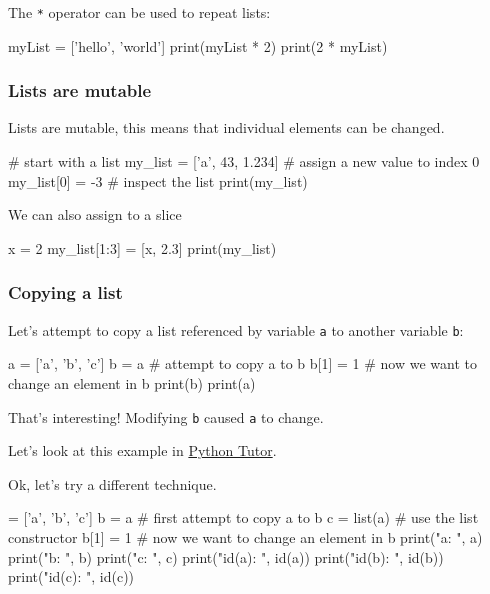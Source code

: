 \documentclass[12pt]{article} \newif\ifsolution\solutiontrue %
\begin{document}
The \texttt{*} operator can be used to repeat lists:

\begin{python}
myList = ['hello', 'world'] print(myList * 2) print(2 * myList)
\end{python}

\subsubsection{Lists are mutable}\label{lists-are-mutable}

Lists are mutable, this means that individual elements can be changed.

\begin{python}
# start with a list my_list = ['a', 43, 1.234] # assign a new value to index 0 my_list[0] = -3 # inspect the list print(my_list)
\end{python}

We can also assign to a slice

\begin{python}
x = 2 my_list[1:3] = [x, 2.3] print(my_list)
\end{python}


\subsubsection{Copying a list}\label{copying-a-list}

Let's attempt to copy a list referenced by variable \texttt{a} to
another variable \texttt{b}:

\begin{python}
a = ['a', 'b', 'c'] b = a # attempt to copy a to b b[1] = 1 # now we want to change an element in b print(b) print(a)
\end{python}

That's interesting! Modifying \texttt{b} caused \texttt{a} to change.

Let's look at this example in
\href{http://pythontutor.com/iframe-embed.html\#code=a+\%3D+\%5B'a',+'b',+'c'\%5D\%0Ab+\%3D+a+\%23+attempt+to+copy+a+to+b\%0Ab\%5B1\%5D+\%3D+1+\%23+now+we+want+to+change+an+element+in+b\%0Aprint(b\%29\%0Aprint(a\%29\%0A\&origin=opt-frontend.js\&cumulative=false\&heapPrimitives=false\&textReferences=false\&py=3\&rawInputLstJSON=\%5B\%5D\&curInstr=0\&codeDivWidth=350\&codeDivHeight=400}{Python
Tutor}.

Ok, let's try a different technique.

\begin{python}
 = ['a', 'b', 'c'] b = a       # first attempt to copy a to b c = list(a) # use the list constructor b[1] = 1    # now we want to change an element in b print("a: ", a) print("b: ", b) print("c: ", c) print("id(a): ", id(a)) print("id(b): ", id(b)) print("id(c): ", id(c))
\end{python}
\end{document}
